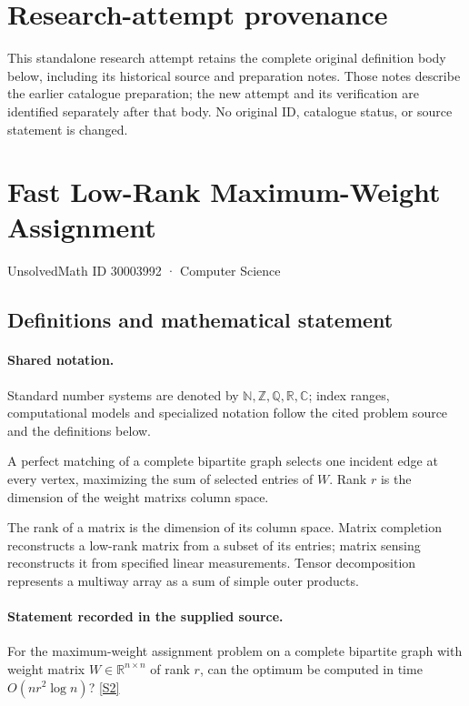\documentclass[11pt]{article}
\begin{document}
\section*{Research-attempt provenance}
This standalone research attempt retains the complete original definition body below,
including its historical source and preparation notes. Those notes describe the
earlier catalogue preparation; the new attempt and its verification are identified
separately after that body. No original ID, catalogue status, or source statement is changed.

\section{Fast Low-Rank Maximum-Weight Assignment}\label{30003992}
{\small UnsolvedMath ID 30003992 · Computer Science}
\subsection{Definitions and mathematical statement}

\paragraph{Shared notation.}Standard number systems are denoted by $\mathbb N,\mathbb Z,\mathbb Q,\mathbb R,\mathbb C$; index ranges, computational models and specialized notation follow the cited problem source and the definitions below.


A perfect matching of a complete bipartite graph selects one incident edge at every vertex, maximizing the sum of selected entries of $W$. Rank $r$ is the dimension of the weight matrix\textquotesingle s column space.

The rank of a matrix is the dimension of its column space. Matrix completion reconstructs a low-rank matrix from a subset of its entries; matrix sensing reconstructs it from specified linear measurements. Tensor decomposition represents a multiway array as a sum of simple outer products.
\paragraph{Statement recorded in the supplied source.}
For the maximum-weight assignment problem on a complete bipartite graph with weight matrix $W\in\mathbb R^{n\times n}$ of rank $r$, can the optimum be computed in time $O(nr^2\log n)$? \href{https://doi.org/10.4171/owr/2018/50}{[S2]}
\end{document}
